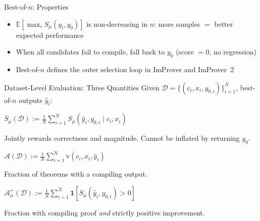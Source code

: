 \documentclass{beamer}
\begin{document}
\begin{frame}{Best-of-$n$: Properties}
\vspace{0.6em}
\begin{itemize}\setlength{\itemsep}{12pt}
  \item $\mathbb{E}[\max_i S_\mu(y_i, y_0)]$ is non-decreasing in $n$: more samples $=$ better expected performance
  \item When all candidates fail to compile, fall back to $y_0$ (score $= 0$, no regression)
  \item Best-of-$n$ defines the outer selection loop in ImProver and ImProver~2
\end{itemize}
\end{frame}

\begin{frame}{Dataset-Level Evaluation: Three Quantities}
\vspace{0.2em}
Given $\mathcal{D} = \{(c_i, x_i, y_{0,i})\}_{i=1}^N$, best-of-$n$ outputs $\hat{y}_i$:
\vspace{0.2em}
\begin{definition}
$\overline{S}_\mu(\mathcal{D}) := \frac{1}{N}\sum_{i=1}^{N} S_\mu(\hat{y}_i, y_{0,i} \mid c_i, x_i)$
\end{definition}
\vspace{-0.1em}
\small Jointly rewards correctness and magnitude. Cannot be inflated by returning $y_0$.
\vspace{0.2em}
\begin{definition}
$\mathcal{A}(\mathcal{D}) := \frac{1}{N}\sum_{i=1}^{N}\mathrm{v}(c_i, x_i, \hat{y}_i)$
\end{definition}
\vspace{-0.1em}
\small Fraction of theorems with a compiling output.
\vspace{0.2em}
\begin{definition}
$\mathcal{A}^+_\mu(\mathcal{D}) := \frac{1}{N}\sum_{i=1}^{N}\mathbf{1}[S_\mu(\hat{y}_i, y_{0,i}) > 0]$
\end{definition}
\vspace{-0.1em}
\small Fraction with compiling proof \emph{and} strictly positive improvement.
\end{frame}
\end{document}
